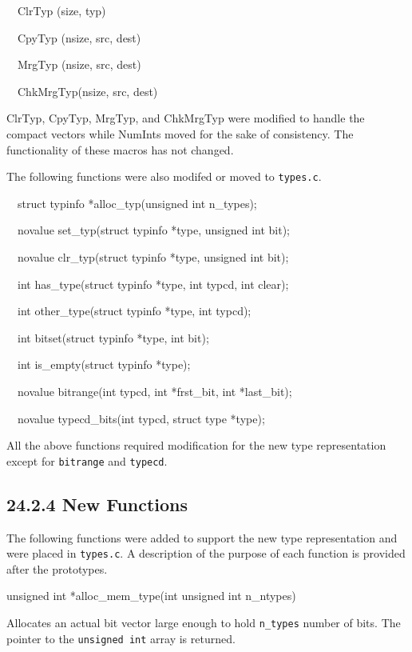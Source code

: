 {\ttfamily\mdseries
\ \ ClrTyp (size, typ)}

{\ttfamily\mdseries
\ \ CpyTyp (nsize, src, dest)}

{\ttfamily\mdseries
\ \ MrgTyp (nsize, src, dest)}

{\ttfamily\mdseries
\ \ ChkMrgTyp(nsize, src, dest)}

ClrTyp, CpyTyp, MrgTyp, and ChkMrgTyp were modified to handle the
compact vectors while NumInts moved for the sake of consistency. The
functionality of these macros has not changed.

The following functions were also modifed or moved to \texttt{types.c}.

{\ttfamily\mdseries
\ \ struct typinfo *alloc\_typ(unsigned int n\_types);}

{\ttfamily\mdseries
\ \ novalue set\_typ(struct typinfo *type, unsigned int bit);}

{\ttfamily\mdseries
\ \ novalue clr\_typ(struct typinfo *type, unsigned int bit);}

{\ttfamily\mdseries
\ \ int has\_type(struct typinfo *type, int typcd, int clear);}

{\ttfamily\mdseries
\ \ int other\_type(struct typinfo *type, int typcd);}

{\ttfamily\mdseries
\ \ int bitset(struct typinfo *type, int bit);}

{\ttfamily\mdseries
\ \ int is\_empty(struct typinfo *type);}

{\ttfamily\mdseries
\ \ novalue bitrange(int typcd, int *frst\_bit, int *last\_bit);}

{\ttfamily\mdseries
\ \ novalue typecd\_bits(int typcd, struct type *type);}


All the above functions required modification for the new type
representation except for \texttt{bitrange} and \texttt{typecd}.

\subsection[24.2.4 New Functions]{24.2.4 New Functions}

The following functions were added to support the new type
representation and were placed in \texttt{types.c}. A description of
the purpose of each function is provided after the prototypes.

{\ttfamily\mdseries
unsigned int *alloc\_mem\_type(int unsigned int n\_ntypes)}

Allocates an actual bit vector large enough to hold \texttt{n\_types}
number of bits. The pointer to the \texttt{unsigned int} array is
returned.

